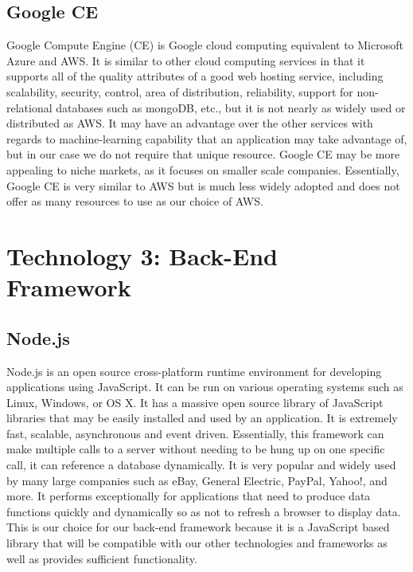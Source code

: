 \documentclass[onecolumn, draftclsnofoot,10pt, compsoc]{IEEEtran}
\begin{document}
	\subsection{Google CE}
	
		Google Compute Engine (CE) is Google cloud computing equivalent to Microsoft Azure and AWS. It is similar to other cloud computing services in that it supports all of 
		the quality attributes of a good web hosting service, including scalability, security, control, area of distribution, reliability, support for non-relational databases
		such as mongoDB, etc., but it is not nearly as widely used or distributed as AWS. It may have an advantage over the other services with regards to machine-learning capability that an application
		may take advantage of, but in our case we do not require that unique resource. Google CE may be more appealing to niche markets, as it focuses on smaller scale companies.
		Essentially, Google CE is very similar to AWS but is much less widely adopted and does not offer as many resources to use as our choice of AWS.
	
	
\section{Technology 3: Back-End Framework}

	\subsection{Node.js}
	
		Node.js is an open source cross-platform runtime environment for developing applications using JavaScript. It can be run on various operating systems such as Linux, Windows, or OS X.
		It has a massive open source library of JavaScript libraries that may be easily installed and used by an application. It is extremely fast, scalable, asynchronous and
		event driven. Essentially, this framework can make multiple calls to a server without needing to be hung up on one specific call, it can reference a database dynamically. 
		It is very popular and widely used by many large companies such as eBay, General Electric, PayPal, Yahoo!, and more. It performs exceptionally for applications that need to produce data
		functions quickly and dynamically so as not to refresh a browser to display data. This is our choice for our back-end framework because it is a JavaScript based library 
		that will be compatible with our other technologies and frameworks as well as provides sufficient functionality. 
	
\end{document}
